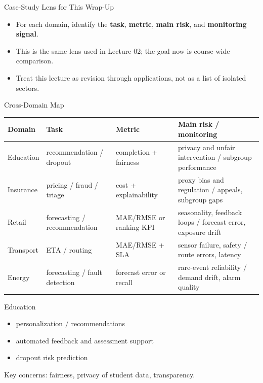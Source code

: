 \documentclass[aspectratio=169]{beamer}
\begin{document}
\begin{frame}{Case-Study Lens for This Wrap-Up}
  \begin{itemize}[<+->]
    \item For each domain, identify the \textbf{task}, \textbf{metric}, \textbf{main risk}, and \textbf{monitoring signal}.
    \item This is the same lens used in Lecture 02; the goal now is course-wide comparison.
    \item Treat this lecture as revision through applications, not as a list of isolated sectors.
  \end{itemize}
\end{frame}

\begin{frame}{Cross-Domain Map}
  \scriptsize
  \begin{tabular}{p{1.9cm}p{2.2cm}p{2.0cm}p{4.9cm}}
    \toprule
    \textbf{Domain} & \textbf{Task} & \textbf{Metric} & \textbf{Main risk / monitoring} \\
    \midrule
    Education & recommendation / dropout & completion + fairness & privacy and unfair intervention / subgroup performance \\
    Insurance & pricing / fraud / triage & cost + explainability & proxy bias and regulation / appeals, subgroup gaps \\
    Retail & forecasting / recommendation & MAE/RMSE or ranking KPI & seasonality, feedback loops / forecast error, exposure drift \\
    Transport & ETA / routing & MAE/RMSE + SLA & sensor failure, safety / route errors, latency \\
    Energy & forecasting / fault detection & forecast error or recall & rare-event reliability / demand drift, alarm quality \\
    \bottomrule
  \end{tabular}
\end{frame}

\begin{frame}{Education}
  \begin{itemize}[<+->]
    \item personalization / recommendations
    \item automated feedback and assessment support
    \item dropout risk prediction
  \end{itemize}
  Key concerns: fairness, privacy of student data, transparency.
\end{frame}
\end{document}
